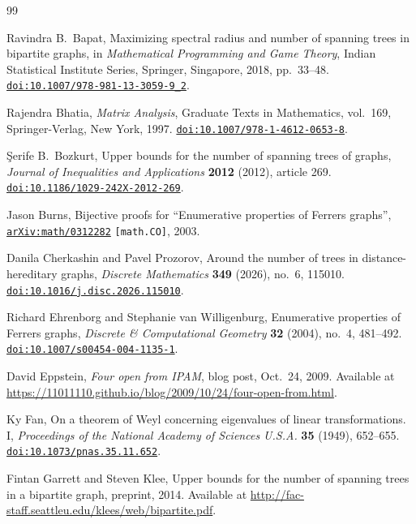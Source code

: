 \documentclass[twoside, reqno]{amsart}
\theoremstyle{definition}
\theoremstyle{remark}
\begin{document}
\begin{thebibliography}{99}

Ravindra B.~Bapat,
Maximizing spectral radius and number of spanning trees in bipartite graphs,
in \emph{Mathematical Programming and Game Theory},
Indian Statistical Institute Series, Springer, Singapore, 2018, pp.~33--48.
\href{https://doi.org/10.1007/978-981-13-3059-9_2}{\nolinkurl{doi:10.1007/978-981-13-3059-9\_2}}.

Rajendra Bhatia,
\emph{Matrix Analysis},
Graduate Texts in Mathematics, vol.~169, Springer-Verlag, New York, 1997.
\href{https://doi.org/10.1007/978-1-4612-0653-8}{\nolinkurl{doi:10.1007/978-1-4612-0653-8}}.

\c{S}erife B.~Bozkurt,
Upper bounds for the number of spanning trees of graphs,
\emph{Journal of Inequalities and Applications} \textbf{2012} (2012), article 269.
\href{https://doi.org/10.1186/1029-242X-2012-269}{\nolinkurl{doi:10.1186/1029-242X-2012-269}}.

Jason Burns,
Bijective proofs for ``Enumerative properties of Ferrers graphs'',
\href{https://arxiv.org/abs/math/0312282}{\nolinkurl{arXiv:math/0312282}}
\texttt{[math.CO]}, 2003.

Danila Cherkashin and Pavel Prozorov,
Around the number of trees in distance-hereditary graphs,
\emph{Discrete Mathematics} \textbf{349} (2026), no.~6, 115010.
\href{https://doi.org/10.1016/j.disc.2026.115010}{\nolinkurl{doi:10.1016/j.disc.2026.115010}}.

Richard Ehrenborg and Stephanie van Willigenburg,
Enumerative properties of Ferrers graphs,
\emph{Discrete \& Computational Geometry} \textbf{32} (2004), no.~4, 481--492.
\href{https://doi.org/10.1007/s00454-004-1135-1}{\nolinkurl{doi:10.1007/s00454-004-1135-1}}.

David Eppstein,
\emph{Four open from IPAM},
blog post, Oct.~24, 2009.
Available at \url{https://11011110.github.io/blog/2009/10/24/four-open-from.html}.

Ky Fan,
On a theorem of Weyl concerning eigenvalues of linear transformations. I,
\emph{Proceedings of the National Academy of Sciences U.S.A.} \textbf{35} (1949), 652--655.
\href{https://doi.org/10.1073/pnas.35.11.652}{\nolinkurl{doi:10.1073/pnas.35.11.652}}.

Fintan Garrett and Steven Klee,
Upper bounds for the number of spanning trees in a bipartite graph,
preprint, 2014.
Available at \url{http://fac-staff.seattleu.edu/klees/web/bipartite.pdf}.


\end{thebibliography}
\end{document}
